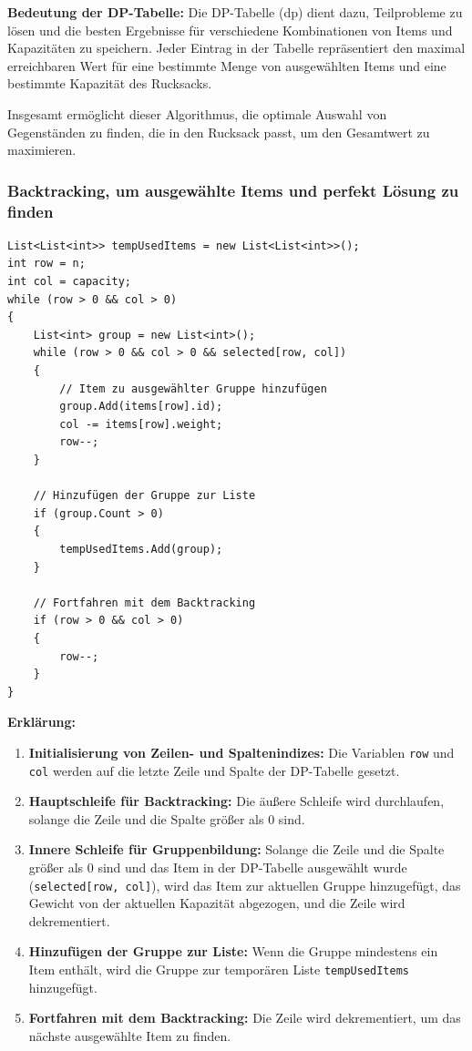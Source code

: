 \textbf{Bedeutung der DP-Tabelle:}
Die DP-Tabelle (dp) dient dazu, Teilprobleme zu lösen und die besten Ergebnisse für verschiedene Kombinationen
von Items und Kapazitäten zu speichern. Jeder Eintrag in der Tabelle repräsentiert den maximal erreichbaren Wert
für eine bestimmte Menge von ausgewählten Items und eine bestimmte Kapazität des Rucksacks.

Insgesamt ermöglicht dieser Algorithmus, die optimale Auswahl von Gegenständen zu finden, die in den Rucksack
passt, um den Gesamtwert zu maximieren.


\subsubsection{Backtracking, um ausgewählte Items und perfekt Lösung zu finden}
\begin{lstlisting}[style=csharp, caption={}, label=code:backtrack]
List<List<int>> tempUsedItems = new List<List<int>>();
int row = n;
int col = capacity;
while (row > 0 && col > 0)
{
    List<int> group = new List<int>();
    while (row > 0 && col > 0 && selected[row, col])
    {
        // Item zu ausgewählter Gruppe hinzufügen
        group.Add(items[row].id);
        col -= items[row].weight;
        row--;
    }

    // Hinzufügen der Gruppe zur Liste
    if (group.Count > 0)
    {
        tempUsedItems.Add(group);
    }

    // Fortfahren mit dem Backtracking
    if (row > 0 && col > 0)
    {
        row--;
    }
}
\end{lstlisting}

\textbf{Erklärung:}
\begin{enumerate}
    \item \textbf{Initialisierung von Zeilen- und Spaltenindizes:} Die Variablen \texttt{row} und \texttt{col} werden auf die letzte Zeile und Spalte der DP-Tabelle gesetzt.

    \item \textbf{Hauptschleife für Backtracking:} Die äußere Schleife wird durchlaufen, solange die Zeile und die Spalte größer als 0 sind.

    \item \textbf{Innere Schleife für Gruppenbildung:} Solange die Zeile und die Spalte größer als 0 sind und das Item in der DP-Tabelle ausgewählt wurde (\texttt{selected[row, col]}), wird das Item zur aktuellen Gruppe hinzugefügt, das Gewicht von der aktuellen Kapazität abgezogen, und die Zeile wird dekrementiert.

    \item \textbf{Hinzufügen der Gruppe zur Liste:} Wenn die Gruppe mindestens ein Item enthält, wird die Gruppe zur temporären Liste \texttt{tempUsedItems} hinzugefügt.

    \item \textbf{Fortfahren mit dem Backtracking:} Die Zeile wird dekrementiert, um das nächste ausgewählte Item zu finden.
\end{enumerate}

